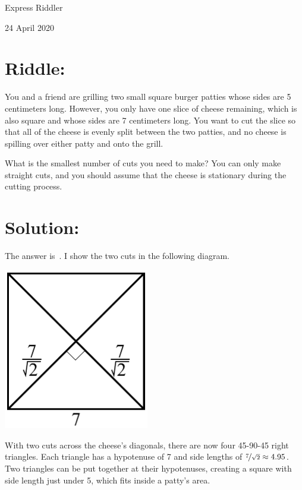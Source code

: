 \documentclass{article}
\begin{document}
\pagestyle{empty} %

\begin{center}
{\LARGE Express Riddler}

\vspace{0.15in}

{\Large 24 April 2020}
\end{center}


\section*{Riddle:}

You and a friend are grilling two small square burger patties whose sides are 5 centimeters long.
However, you only have one slice of cheese remaining, which is also square and whose sides are 7 centimeters long.
You want to cut the slice so that all of the cheese is evenly split between the two patties, and no cheese is spilling over either patty and onto the grill.

What is the smallest number of cuts you need to make?
You can only make straight cuts, and you should assume that the cheese is stationary during the cutting process.

\section*{Solution:}

The answer is
\,.
I show the two cuts in the following diagram.

\begin{center}
\includegraphics[width=2.5in]{cheese_slice.pdf}
\end{center}

With two cuts across the cheese's diagonals, there are now four 45-90-45 right triangles.
Each triangle has a hypotenuse of 7 and side lengths of $\nicefrac{7}{\sqrt{2}}\approx4.95$.
Two triangles can be put together at their hypotenuses, creating a square with side length just under 5, which fits inside a patty's area.
\end{document}
